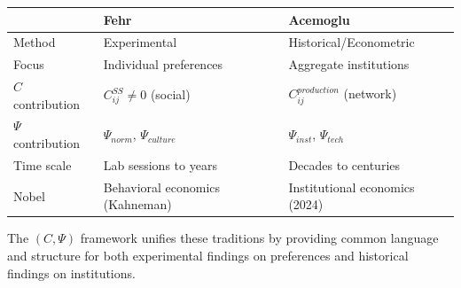 \begin{center}
\renewcommand{\arraystretch}{1.2}
\begin{tabular}{lll}
\hline
& \textbf{Fehr} & \textbf{Acemoglu} \\
\hline
Method & Experimental & Historical/Econometric \\
Focus & Individual preferences & Aggregate institutions \\
$C$ contribution & $C^{SS}_{ij} \neq 0$ (social) & $C_{ij}^{production}$ (network) \\
$\Psi$ contribution & $\Psi_{norm}$, $\Psi_{culture}$ & $\Psi_{inst}$, $\Psi_{tech}$ \\
Time scale & Lab sessions to years & Decades to centuries \\
Nobel & Behavioral economics (Kahneman) & Institutional economics (2024) \\
\hline
\end{tabular}
\end{center}

The $(C, \Psi)$ framework unifies these traditions by providing common
language and structure for both experimental findings on preferences
and historical findings on institutions.

